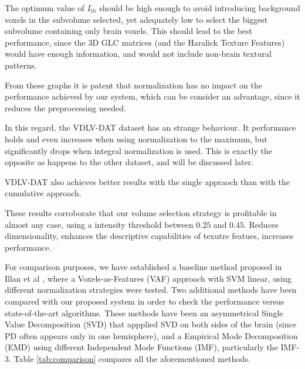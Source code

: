 The optimum value of $I_{th}$ should be high enough to avoid introducing background voxels in the subvolume selected, yet adequately low to select the biggest subvolume containing only brain voxels. This should lead to the best performance, since the 3D GLC matrices (and the Haralick Texture Features) would have enough information, and would not include non-brain textural patterns. 


From these graphs it is patent that normalization has no impact on the performance achieved by our system, which can be consider an advantage, since it reduces the preprocessing needed. 

In this regard, the VDLV-DAT dataset has an strange behaviour. It performance holds and even increases when using normalization to the maximum, but significantly drops when integral normalization is used. This is exactly the opposite as happens to the other dataset, and will be discussed later.  

VDLV-DAT also achieves better results with the single appraoch than with the cumulative approach. 

These results corroborate that our volume selection strategy is profitable in almost any case, using a intensity threshold between $0.25$ and $0.45$. Reduces dimensionality, enhances the descriptive capabilities of texutre featues, increases performance. 



For comparison purposes, we have established a baseline method proposed in Illan et al \cite{Illan2012}, where a Voxels-as-Features (VAF) approach with SVM linear, using different normalization strategies were tested. Two additional methods have been compared with our proposed system in order to check the performance versus state-of-the-art algorithms. These methods have been an asymmetrical Single Value Decomposition (SVD) \cite{Segovia2012} that appplied SVD on both sides of the brain (since PD often appears only in one hemisphere), and a Empirical Mode Decomposition (EMD)  \cite{Rojas2012} using different Independent Mode Functions (IMF), particularly the IMF-3. Table \ref{tab:comparison} compares all the aforementioned methods. 

